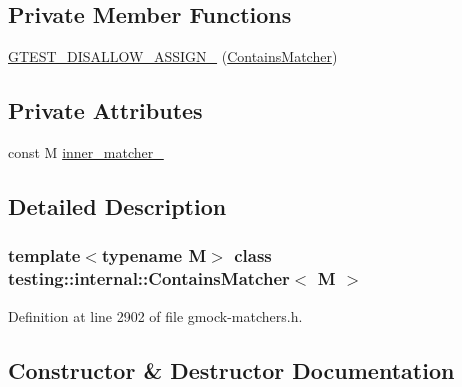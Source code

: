 \subsection*{Private Member Functions}
\begin{DoxyCompactItemize}
\item 
\hyperlink{classtesting_1_1internal_1_1ContainsMatcher_acadb7fc6560c6da919fe80317dcd16cf}{G\+T\+E\+S\+T\+\_\+\+D\+I\+S\+A\+L\+L\+O\+W\+\_\+\+A\+S\+S\+I\+G\+N\+\_\+} (\hyperlink{classtesting_1_1internal_1_1ContainsMatcher}{Contains\+Matcher})
\end{DoxyCompactItemize}
\subsection*{Private Attributes}
\begin{DoxyCompactItemize}
\item 
const M \hyperlink{classtesting_1_1internal_1_1ContainsMatcher_ab6b76656910ef5018783dc258dcb1f08}{inner\+\_\+matcher\+\_\+}
\end{DoxyCompactItemize}


\subsection{Detailed Description}
\subsubsection*{template$<$typename M$>$\newline
class testing\+::internal\+::\+Contains\+Matcher$<$ M $>$}



Definition at line 2902 of file gmock-\/matchers.\+h.



\subsection{Constructor \& Destructor Documentation}
\mbox{\label{classtesting_1_1internal_1_1ContainsMatcher_a063d429bb4e59087ecdd51a037b8128a}} 
